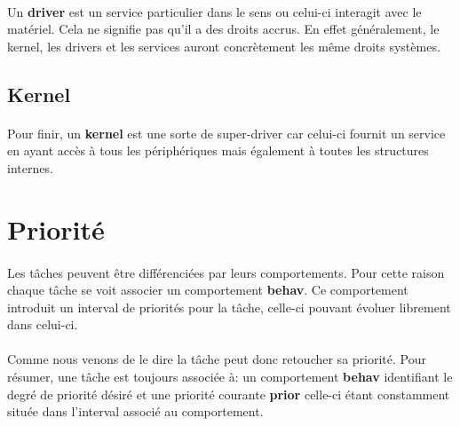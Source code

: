\documentclass[10pt,a4wide]{article}
\begin{document}
\paragraph{}

Un \textbf{driver} est un service particulier dans le sens ou celui-ci
interagit avec le mat\'eriel. Cela ne signifie pas qu'il a des droits
accrus. En effet g\'en\'eralement, le kernel, les drivers et les services
auront concr\`etement les m\^eme droits syst\`emes.

\subsection{Kernel}

\paragraph{}

Pour finir, un \textbf{kernel} est une sorte de super-driver car celui-ci
fournit un service en ayant acc\`es \`a tous les p\'eriph\'eriques mais
\'egalement \`a toutes les structures internes.

\section{Priorit\'e}

\paragraph{}

Les t\^aches peuvent \^etre diff\'erenci\'ees par leurs comportements. Pour
cette raison chaque t\^ache se voit associer un comportement \textbf{behav}.
Ce comportement introduit un interval de priorit\'es pour la t\^ache, celle-ci
pouvant \'evoluer librement dans celui-ci.

\paragraph{}

Comme nous venons de le dire la t\^ache peut donc retoucher sa priorit\'e.
Pour r\'esumer, une t\^ache est toujours associ\'ee \`a: un comportement
\textbf{behav} identifiant le degr\'e de priorit\'e d\'esir\'e et
une priorit\'e courante \textbf{prior} celle-ci \'etant constamment
situ\'ee dans l'interval associ\'e au comportement.

\paragraph{}
\end{document}
